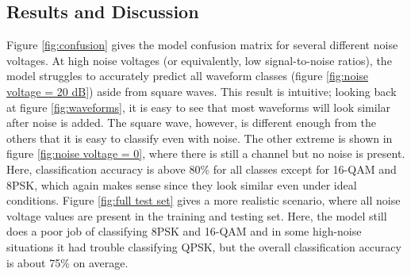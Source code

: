 \documentclass{article}
\begin{document}
\subsection{Results and Discussion}
Figure \ref{fig:confusion} gives the model confusion matrix for several
different noise voltages. At high noise voltages (or equivalently, low
signal-to-noise ratios), the model struggles to accurately predict all
waveform classes (figure \ref{fig:noise voltage = 20 dB}) aside from square
waves. This result is intuitive; looking back at figure \ref{fig:waveforms}, it
is easy to see that most waveforms will look similar after noise is added. The
square wave, however, is different enough from the others that it is easy to
classify even with noise. The other extreme is shown in figure \ref{fig:noise
voltage = 0}, where there is still a channel but no noise is present. Here,
classification accuracy is above 80\% for all classes except for 16-QAM and
8PSK, which again makes sense since they look similar even under ideal
conditions. Figure \ref{fig:full test set} gives a more realistic scenario,
where all noise voltage values are present in the training and testing set.
Here, the model still does a poor job of classifying 8PSK and 16-QAM and in
some high-noise situations it had trouble classifying QPSK, but the overall classification
accuracy is about 75\% on average.
\end{document}
